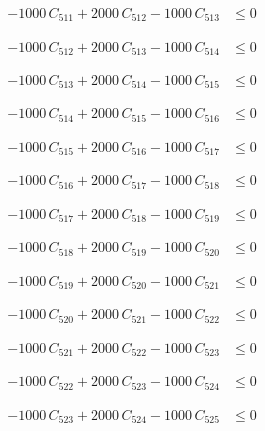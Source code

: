 \documentclass[a4paper,11pt]{article}
\begin{document}
\begin{align}
-1000\,C_{511} + 2000\,C_{512} - 1000\,C_{513} &\leq 0 \nonumber
\end{align}

\begin{align}
-1000\,C_{512} + 2000\,C_{513} - 1000\,C_{514} &\leq 0 \nonumber
\end{align}

\begin{align}
-1000\,C_{513} + 2000\,C_{514} - 1000\,C_{515} &\leq 0 \nonumber
\end{align}

\begin{align}
-1000\,C_{514} + 2000\,C_{515} - 1000\,C_{516} &\leq 0 \nonumber
\end{align}

\begin{align}
-1000\,C_{515} + 2000\,C_{516} - 1000\,C_{517} &\leq 0 \nonumber
\end{align}

\begin{align}
-1000\,C_{516} + 2000\,C_{517} - 1000\,C_{518} &\leq 0 \nonumber
\end{align}

\begin{align}
-1000\,C_{517} + 2000\,C_{518} - 1000\,C_{519} &\leq 0 \nonumber
\end{align}

\begin{align}
-1000\,C_{518} + 2000\,C_{519} - 1000\,C_{520} &\leq 0 \nonumber
\end{align}

\begin{align}
-1000\,C_{519} + 2000\,C_{520} - 1000\,C_{521} &\leq 0 \nonumber
\end{align}

\begin{align}
-1000\,C_{520} + 2000\,C_{521} - 1000\,C_{522} &\leq 0 \nonumber
\end{align}

\begin{align}
-1000\,C_{521} + 2000\,C_{522} - 1000\,C_{523} &\leq 0 \nonumber
\end{align}

\begin{align}
-1000\,C_{522} + 2000\,C_{523} - 1000\,C_{524} &\leq 0 \nonumber
\end{align}

\begin{align}
-1000\,C_{523} + 2000\,C_{524} - 1000\,C_{525} &\leq 0 \nonumber
\end{align}
\end{document}
